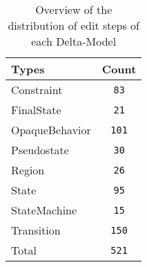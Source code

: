 \begin{table} 
 \center 
 \small 
\begin{tabular}{|l|c|}
\hline
Types & Count\\ 
  \hline 
Constraint & \texttt{83}\\ 
  \hline 
FinalState & \texttt{21}\\ 
  \hline 
OpaqueBehavior & \texttt{101}\\ 
  \hline 
Pseudostate & \texttt{30}\\ 
  \hline 
Region & \texttt{26}\\ 
  \hline 
State & \texttt{95}\\ 
  \hline 
StateMachine & \texttt{15}\\ 
  \hline 
Transition & \texttt{150}\\ 
  \hline 
Total & \texttt{521}\\ 
  \hline 
\end{tabular}
\caption[Overview: Delta-Models]{Overview of the distribution of edit steps of each Delta-Model}
\end{table}

